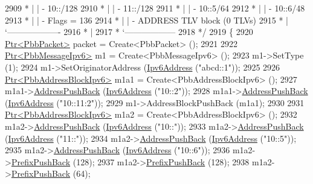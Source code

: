 \begin{DoxyCode}
2909 \textcolor{comment}{         * |    |     - 10::/128}
2910 \textcolor{comment}{         * |    |     - 11::/128}
2911 \textcolor{comment}{         * |    |     - 10::5/64}
2912 \textcolor{comment}{         * |    |     - 10::6/48}
2913 \textcolor{comment}{         * |    |     - Flags = 136}
2914 \textcolor{comment}{         * |    | - ADDRESS TLV block (0 TLVs)}
2915 \textcolor{comment}{         * |    `-------------------}
2916 \textcolor{comment}{         * |}
2917 \textcolor{comment}{         * `------------------}
2918 \textcolor{comment}{   */}
2919   \{
2920     \hyperlink{classns3_1_1Ptr}{Ptr<PbbPacket>} packet = Create<PbbPacket> ();
2921 
2922     \hyperlink{classns3_1_1Ptr}{Ptr<PbbMessageIpv6>} m1 = Create<PbbMessageIpv6> ();
2923     m1->SetType (1);
2924     m1->SetOriginatorAddress (\hyperlink{classns3_1_1Ipv6Address}{Ipv6Address} (\textcolor{stringliteral}{"abcd::1"}));
2925 
2926     \hyperlink{classns3_1_1Ptr}{Ptr<PbbAddressBlockIpv6>} m1a1 = Create<PbbAddressBlockIpv6> ();
2927     m1a1->\hyperlink{classns3_1_1PbbAddressBlock_a7be545a53d69bd426dbebcf752ed8371}{AddressPushBack} (\hyperlink{classns3_1_1Ipv6Address}{Ipv6Address} (\textcolor{stringliteral}{"10::2"}));
2928     m1a1->\hyperlink{classns3_1_1PbbAddressBlock_a7be545a53d69bd426dbebcf752ed8371}{AddressPushBack} (\hyperlink{classns3_1_1Ipv6Address}{Ipv6Address} (\textcolor{stringliteral}{"10::11:2"}));
2929     m1->AddressBlockPushBack (m1a1);
2930 
2931     \hyperlink{classns3_1_1Ptr}{Ptr<PbbAddressBlockIpv6>} m1a2 = Create<PbbAddressBlockIpv6> ();
2932     m1a2->\hyperlink{classns3_1_1PbbAddressBlock_a7be545a53d69bd426dbebcf752ed8371}{AddressPushBack} (\hyperlink{classns3_1_1Ipv6Address}{Ipv6Address} (\textcolor{stringliteral}{"10::"}));
2933     m1a2->\hyperlink{classns3_1_1PbbAddressBlock_a7be545a53d69bd426dbebcf752ed8371}{AddressPushBack} (\hyperlink{classns3_1_1Ipv6Address}{Ipv6Address} (\textcolor{stringliteral}{"11::"}));
2934     m1a2->\hyperlink{classns3_1_1PbbAddressBlock_a7be545a53d69bd426dbebcf752ed8371}{AddressPushBack} (\hyperlink{classns3_1_1Ipv6Address}{Ipv6Address} (\textcolor{stringliteral}{"10::5"}));
2935     m1a2->\hyperlink{classns3_1_1PbbAddressBlock_a7be545a53d69bd426dbebcf752ed8371}{AddressPushBack} (\hyperlink{classns3_1_1Ipv6Address}{Ipv6Address} (\textcolor{stringliteral}{"10::6"}));
2936     m1a2->\hyperlink{classns3_1_1PbbAddressBlock_a8e6f539ccffd043a2890396d882d0a42}{PrefixPushBack} (128);
2937     m1a2->\hyperlink{classns3_1_1PbbAddressBlock_a8e6f539ccffd043a2890396d882d0a42}{PrefixPushBack} (128);
2938     m1a2->\hyperlink{classns3_1_1PbbAddressBlock_a8e6f539ccffd043a2890396d882d0a42}{PrefixPushBack} (64);

\end{DoxyCode}
